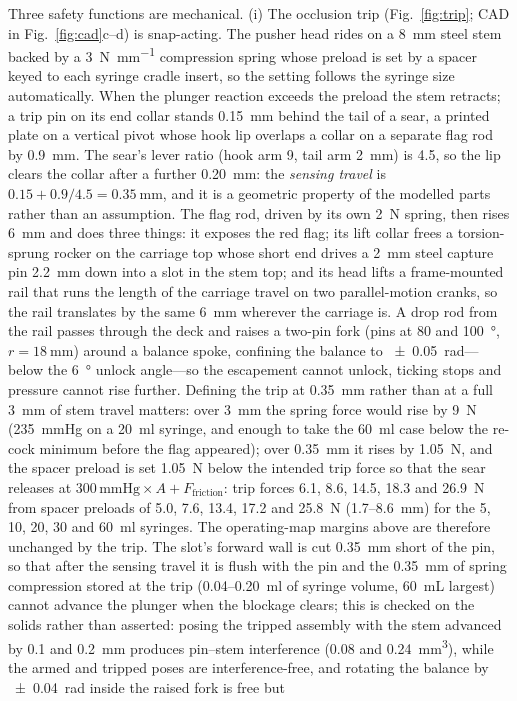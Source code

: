 \documentclass[11pt,a4paper]{article}
\begin{document}
Three safety functions are mechanical. (i) The occlusion trip (Fig.~\ref{fig:trip}; CAD in Fig.~\ref{fig:cad}c--d) is snap-acting. The pusher head rides on a \SI{8}{\milli\metre} steel stem backed by a \SI{3}{\newton\per\milli\metre} compression spring whose preload is set by a spacer keyed to each syringe cradle insert, so the setting follows the syringe size automatically. When the plunger reaction exceeds the preload the stem retracts; a trip pin on its end collar stands \SI{0.15}{\milli\metre} behind the tail of a sear, a printed plate on a vertical pivot whose hook lip overlaps a collar on a separate flag rod by \SI{0.9}{\milli\metre}. The sear's lever ratio (hook arm 9, tail arm \SI{2}{\milli\metre}) is 4.5, so the lip clears the collar after a further \SI{0.20}{\milli\metre}: the \emph{sensing travel} is $0.15 + 0.9/4.5 = \SI{0.35}{\milli\metre}$, and it is a geometric property of the modelled parts rather than an assumption. The flag rod, driven by its own \SI{2}{\newton} spring, then rises \SI{6}{\milli\metre} and does three things: it exposes the red flag; its lift collar frees a torsion-sprung rocker on the carriage top whose short end drives a \SI{2}{\milli\metre} steel capture pin \SI{2.2}{\milli\metre} down into a slot in the stem top; and its head lifts a frame-mounted rail that runs the length of the carriage travel on two parallel-motion cranks, so the rail translates by the same \SI{6}{\milli\metre} wherever the carriage is. A drop rod from the rail passes through the deck and raises a two-pin fork (pins at \SI{80}{} and \SI{100}{\degree}, $r = \SI{18}{\milli\metre}$) around a balance spoke, confining the balance to \SI{\pm 0.05}{\radian}---below the \SI{6}{\degree} unlock angle---so the escapement cannot unlock, ticking stops and pressure cannot rise further. Defining the trip at \SI{0.35}{\milli\metre} rather than at a full \SI{3}{\milli\metre} of stem travel matters: over \SI{3}{\milli\metre} the spring force would rise by \SI{9}{\newton} (\SI{+235}{mmHg} on a \SI{20}{\milli\litre} syringe, and enough to take the \SI{60}{\milli\litre} case below the re-cock minimum before the flag appeared); over \SI{0.35}{\milli\metre} it rises by \SI{1.05}{\newton}, and the spacer preload is set \SI{1.05}{\newton} below the intended trip force so that the sear releases at $300\,\mathrm{mmHg}\times A + F_{\mathrm{friction}}$: trip forces 6.1, 8.6, 14.5, 18.3 and \SI{26.9}{\newton} from spacer preloads of 5.0, 7.6, 13.4, 17.2 and \SI{25.8}{\newton} (1.7--\SI{8.6}{\milli\metre}) for the 5, 10, 20, 30 and \SI{60}{\milli\litre} syringes. The operating-map margins above are therefore unchanged by the trip. The slot's forward wall is cut \SI{0.35}{\milli\metre} short of the pin, so that after the sensing travel it is flush with the pin and the \SI{0.35}{\milli\metre} of spring compression stored at the trip (0.04--\SI{0.20}{\milli\litre} of syringe volume, 60~mL largest) cannot advance the plunger when the blockage clears; this is checked on the solids rather than asserted: posing the tripped assembly with the stem advanced by 0.1 and \SI{0.2}{\milli\metre} produces pin--stem interference (0.08 and \SI{0.24}{\milli\metre\cubed}), while the armed and tripped poses are interference-free, and rotating the balance by \SI{\pm 0.04}{\radian} inside the raised fork is free but 
\end{document}
